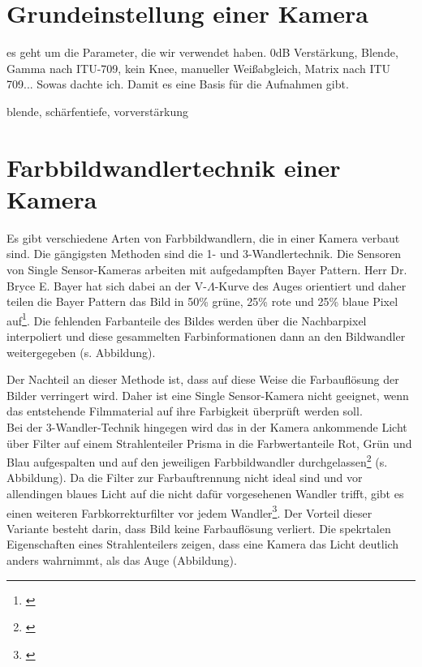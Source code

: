 \section{Grundeinstellung einer Kamera}

 es geht um die Parameter, die wir verwendet haben. 0dB Verstärkung, Blende, Gamma nach ITU-709, kein Knee, manueller Weißabgleich, Matrix nach ITU 709... Sowas dachte ich. Damit es eine Basis für die Aufnahmen gibt.

blende, schärfentiefe, vorverstärkung

\section{Farbbildwandlertechnik einer Kamera}
\label{sec_wandler}
Es gibt verschiedene Arten von Farbbildwandlern, die in einer Kamera verbaut sind. Die gängigsten Methoden sind die 1- und 3-Wandlertechnik. Die Sensoren von \glqq Single Sensor\grqq -Kameras arbeiten mit aufgedampften Bayer Pattern. Herr Dr. Bryce E. Bayer hat sich dabei an der V-$\Lambda$-Kurve des Auges orientiert und daher teilen die Bayer Pattern das Bild in 50\% grüne, 25\% rote und 25\% blaue Pixel auf\footnote{\cite{itwissen}}. Die fehlenden Farbanteile des Bildes werden über die Nachbarpixel interpoliert und diese gesammelten Farbinformationen dann an den Bildwandler weitergegeben (s. Abbildung).

Der Nachteil an dieser Methode ist, dass auf diese Weise die Farbauflösung der Bilder verringert wird. Daher ist eine \glqq Single Sensor\grqq -Kamera nicht geeignet, wenn das entstehende Filmmaterial auf ihre Farbigkeit überprüft werden soll.\\
Bei der 3-Wandler-Technik hingegen wird das in der Kamera ankommende Licht über Filter auf einem Strahlenteiler Prisma in die Farbwertanteile Rot, Grün und Blau aufgespalten und auf den jeweiligen Farbbildwandler durchgelassen\footnote{\cite[378]{schmidt}} (s. Abbildung). 
Da die Filter zur Farbauftrennung nicht ideal sind und vor allendingen blaues Licht auf die nicht dafür vorgesehenen Wandler trifft, gibt es einen weiteren Farbkorrekturfilter vor jedem Wandler\footnote{\cite[379]{schmidt}}. Der Vorteil dieser Variante besteht darin, dass Bild keine Farbauflösung verliert. Die spekrtalen Eigenschaften eines Strahlenteilers zeigen, dass eine Kamera das Licht deutlich anders wahrnimmt, als das Auge (Abbildung).



